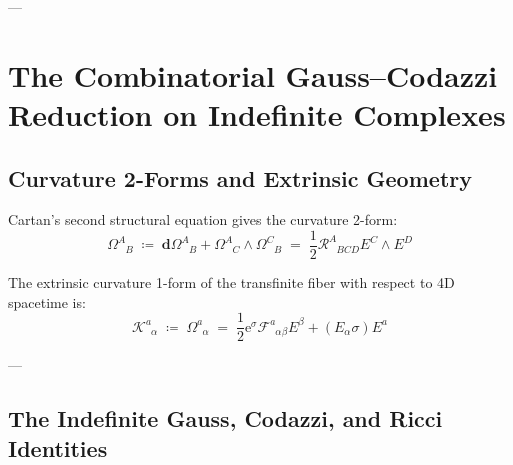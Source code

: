 \documentclass[
    12pt,
    a4paper,
    headings=normal,
    twoside=false,
    open=any,
    parskip=half
]{scrbook}
\newcommand{\eu}{\mathrm{e}}
\begin{document}
---

\section{The Combinatorial Gauss--Codazzi Reduction on Indefinite Complexes}
\label{sec:ch2_gauss_codazzi_decomposition}

\subsection{Curvature 2-Forms and Extrinsic Geometry}

Cartan's second structural equation gives the curvature 2-form:
\begin{equation}
\Omega^A_{\phantom{A}B} \;\coloneqq\; \mathbf{d} \Omega^A_{\phantom{A}B} + \Omega^A_{\phantom{A}C} \wedge \Omega^C_{\phantom{A}B} \;=\; \frac{1}{2} \mathcal{R}^A_{\phantom{A}BCD} E^C \wedge E^D
\label{eq:ch2_curvature_2_form_cartan}
\end{equation}

\begin{physdefinition}\label{def:ch2_extrinsic_curvature}
The extrinsic curvature 1-form of the transfinite fiber with respect to 4D spacetime is:
\begin{equation}
\mathcal{K}^a_{\phantom{a}\alpha} \;\coloneqq\; \Omega^a_{\phantom{a}\alpha} \;=\; \frac{1}{2} \eu^\sigma \mathcal{F}^a_{\phantom{a}\alpha\beta} E^\beta + \left( E_\alpha \sigma \right) E^a
\label{eq:ch2_extrinsic_curvature_def}
\end{equation}
\end{physdefinition}

---

\subsection{The Indefinite Gauss, Codazzi, and Ricci Identities}
\end{document}
